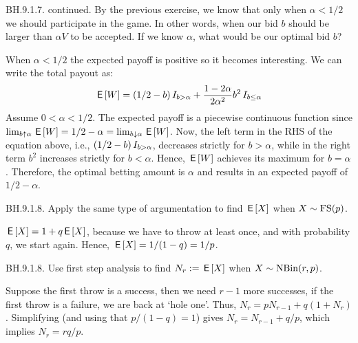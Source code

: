 \begin{exercise}
  BH.9.1.7. continued. By the previous exercise, we know that only when $\alpha<1/2$ we should participate in the game. In other words, when our bid $b$ should be larger than $\alpha V$ to be accepted. If we know $\alpha$, what would be our optimal bid $b$?
\begin{solution}
  When $\alpha < 1/2$ the expected payoff is positive so it becomes interesting. We can write the total payout as:
 \begin{align*}
   \,\mathsf{E}\left[W\right] &= (1/2 - b) \,I_{b>\alpha} + \frac{1-2\alpha}{2\alpha^2}b^2 \,I_{b\leq \alpha}\\
  \end{align*}
  Assume $0<\alpha<1/2$. The expected payoff is a piecewise continuous function since $\lim_{b\uparrow \alpha} \,\mathsf{E}\left[W\right]  = 1/2 - \alpha = \lim_{b\downarrow \alpha} \,\mathsf{E}\left[W\right]$.
Now, the left term in the RHS of the equation above, i.e., $(1/2 - b)\,I_{b>\alpha}$, decreases strictly for $b>\alpha$, while in the right term $b^{2}$ increases strictly for $b<\alpha$. Hence, $\,\mathsf{E}\left[W\right]$ achieves its maximum for $b=\alpha$.
Therefore, the optimal betting amount is $\alpha$ and results in an expected payoff of $1/2 - \alpha$.
\end{solution}
\end{exercise}

\begin{exercise}
BH.9.1.8. Apply the same type of argumentation to find $\,\mathsf{E}\left[X\right]$ when $X\sim \mathrm{FS}(p)$.
\begin{solution}
$\,\mathsf{E}\left[X\right] = 1 + q\,\mathsf{E}\left[X\right]$, because we have to throw at least once, and with probability $q$, we start again. Hence, $\,\mathsf{E}\left[X\right] = 1/(1-q) = 1/p$.
\end{solution}
\end{exercise}

\begin{exercise}
BH.9.1.8. Use first step analysis to  find $N_{r} := \,\mathsf{E}\left[X\right]$ when $X\sim \mathrm{NBin}(r,p)$.
\begin{solution}
Suppose the first throw is a success, then we need $r-1$ more successes, if the first throw is a failure, we are back at `hole one'. Thus, $N_{r} = p N_{r-1}+q(1+N_{r})$. Simplifying (and using that $p/(1-q)=1$) gives $N_{r} = N_{r-1} + q/p$, which implies $N_{r} = r q/p$.
\end{solution}
\end{exercise}

